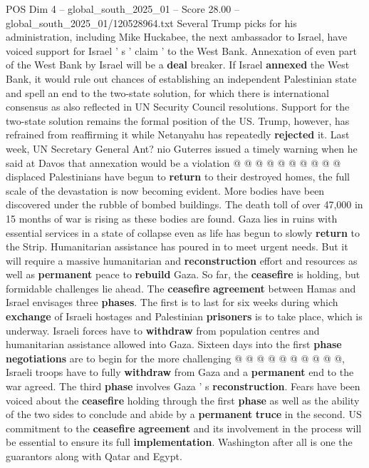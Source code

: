 \begin{textsample}{POS Dim 4 – global\_south\_2025\_01 – Score 28.00 – global\_south\_2025\_01/120528964.txt}
Several Trump picks for his administration, including Mike Huckabee, the next ambassador to Israel, have voiced support for Israel ' s ' claim ' to the West Bank.
Annexation of even part of the West Bank by Israel will be a \textbf{deal} breaker.
If Israel \textbf{annexed} the West Bank, it would rule out chances of establishing an independent Palestinian state and spell an end to the two-state solution, for which there is international consensus as also reflected in UN Security Council resolutions.
Support for the two-state solution remains the formal position of the US.
Trump, however, has refrained from reaffirming it while Netanyahu has repeatedly \textbf{rejected} it.
Last week, UN Secretary General Ant? nio Guterres issued a timely warning when he said at Davos that annexation would be a violation @ @ @ @ @ @ @ @ @ @ displaced Palestinians have begun to \textbf{return} to their destroyed homes, the full scale of the devastation is now becoming evident.
More bodies have been discovered under the rubble of bombed buildings.
The death toll of over 47,000 in 15 months of war is rising as these bodies are found.
Gaza lies in ruins with essential services in a state of collapse even as life has begun to slowly \textbf{return} to the Strip.
Humanitarian assistance has poured in to meet urgent needs.
But it will require a massive humanitarian and \textbf{reconstruction} effort and resources as well as \textbf{permanent} peace to \textbf{rebuild} Gaza.
So far, the \textbf{ceasefire} is holding, but formidable challenges lie ahead.
The \textbf{ceasefire} \textbf{agreement} between Hamas and Israel envisages three \textbf{phases}.
The first is to last for six weeks during which \textbf{exchange} of Israeli hostages and Palestinian \textbf{prisoners} is to take place, which is underway.
Israeli forces have to \textbf{withdraw} from population centres and humanitarian assistance allowed into Gaza.
Sixteen days into the first \textbf{phase} \textbf{negotiations} are to begin for the more challenging @ @ @ @ @ @ @ @ @ @, Israeli troops have to fully \textbf{withdraw} from Gaza and a \textbf{permanent} end to the war agreed.
The third \textbf{phase} involves Gaza ' s \textbf{reconstruction}.
Fears have been voiced about the \textbf{ceasefire} holding through the first \textbf{phase} as well as the ability of the two sides to conclude and abide by a \textbf{permanent} \textbf{truce} in the second.
US commitment to the \textbf{ceasefire} \textbf{agreement} and its involvement in the process will be essential to ensure its full \textbf{implementation}.
Washington after all is one the guarantors along with Qatar and Egypt.

\end{textsample}
